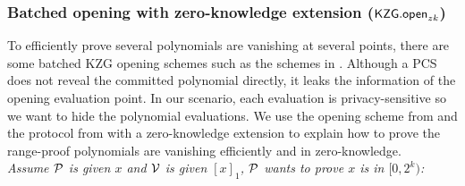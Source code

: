 \subsubsection{Batched opening with zero-knowledge extension ($\mathsf{KZG.open}_{zk}$)}
\label{sec:kgzzkp}


To efficiently prove several polynomials are vanishing at several points, there are some batched KZG opening schemes such as the schemes in \cite{plonk,bdfg,fflonk}. Although a PCS does not reveal the committed polynomial directly, it leaks the information of the opening evaluation point. In our scenario, each evaluation is privacy-sensitive so we want to hide the polynomial evaluations. We use the opening scheme from \cite{plonk} and the protocol from \cite{rangeproof} with a zero-knowledge extension to explain how to prove the range-proof polynomials are vanishing efficiently and in zero-knowledge. \\
\textit{Assume $\mathcal{P}$ is given $x$ and $\mathcal{V}$ is given $[x]_1$, $\mathcal{P}$ wants to prove $x$ is in $[0,2^k)$:}
